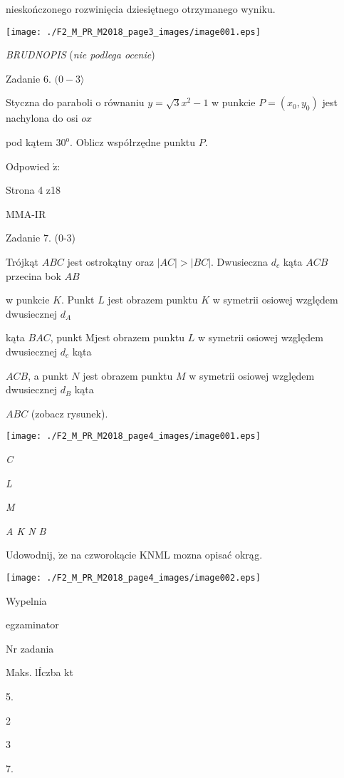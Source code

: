 \documentclass[a4paper,12pt]{article}
\begin{document}
nieskończonego rozwinięcia dziesiętnego otrzymanego wyniku.
\begin{center}
\texttt{[image: ./F2\_M\_PR\_M2018\_page3\_images/image001.eps]}
\end{center}
{\it BRUDNOPIS} ({\it nie podlega ocenie})

Zadanie 6. $(0-3\rangle$

Styczna do paraboli o równaniu $y=\sqrt{3}x^{2}-1$ w punkcie $P=(x_{0},y_{0})$ jest nachylona do osi $ox$

pod kątem $30^{\mathrm{o}}$. Oblicz współrzędne punktu $P.$

Odpowied $\acute{\mathrm{z}}$:

Strona 4 z18

MMA-IR





Zadanie 7. (0-3)

Trójkąt $ABC$ jest ostrokątny oraz $|AC|>|BC|$. Dwusieczna $d_{c}$ kąta $ACB$ przecina bok $AB$

w punkcie $K$. Punkt $L$ jest obrazem punktu $K$ w symetrii osiowej względem dwusiecznej $d_{A}$

kąta $BAC$, punkt Mjest obrazem punktu $L$ w symetrii osiowej względem dwusiecznej $d_{c}$ kąta

$ACB$, a punkt $N$ jest obrazem punktu $M$ w symetrii osiowej względem dwusiecznej $d_{B}$ kąta

$ABC$ (zobacz rysunek).
\begin{center}
\texttt{[image: ./F2\_M\_PR\_M2018\_page4\_images/image001.eps]}
\end{center}
{\it C}

{\it L}

{\it M}

{\it A  K N  B}

Udowodnij, $\dot{\mathrm{z}}\mathrm{e}$ na czworokącie KNML mozna opisać okrąg.
\begin{center}
\texttt{[image: ./F2\_M\_PR\_M2018\_page4\_images/image002.eps]}
\end{center}
Wypelnia

egzaminator

Nr zadania

Maks. lÍczba kt

5.

2

3

7.
\end{document}
